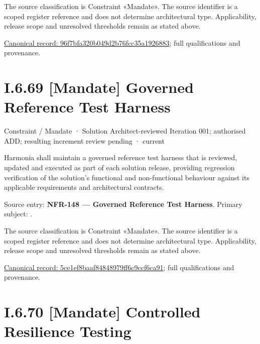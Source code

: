 The source classification is Constraint «Mandate». The source identifier is a scoped register reference and does not determine architectural type. Applicability, release scope and unresolved thresholds remain as stated above.


{\footnotesize \href{../../../../../../../continuum/motivation/constraint/mandate/96f7bfa320b049d2b76fcc35a1926883.md}{Canonical record: 96f7bfa320b049d2b76fcc35a1926883}; full qualifications and provenance.}\par
\section*{I.6.69 [Mandate] Governed Reference Test Harness}
\label{navigation:I.6.69}

\label{element:5ce1ef8baaf84848979ff6c9ccf6ca91}
{\small Constraint / Mandate · Solution Architect-reviewed Iteration 001; authorised ADD; resulting increment review pending · current}\par

Harmonia shall maintain a governed reference test harness that is reviewed, updated and executed as part of each solution release, providing regression verification of the solution's functional and non-functional behaviour against its applicable requirements and architectural contracts.



Source entry: \textbf{NFR-148 — Governed Reference Test Harness}. Primary subject: \texttt{}.



The source classification is Constraint «Mandate». The source identifier is a scoped register reference and does not determine architectural type. Applicability, release scope and unresolved thresholds remain as stated above.


{\footnotesize \href{../../../../../../../continuum/motivation/constraint/mandate/5ce1ef8baaf84848979ff6c9ccf6ca91.md}{Canonical record: 5ce1ef8baaf84848979ff6c9ccf6ca91}; full qualifications and provenance.}\par
\section*{I.6.70 [Mandate] Controlled Resilience Testing}
\label{navigation:I.6.70}

